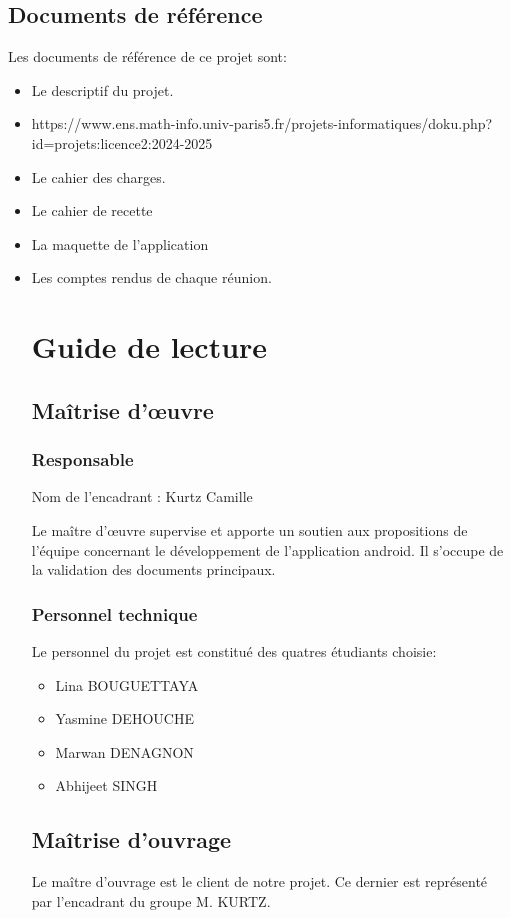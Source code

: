 \documentclass{conception_detaillee}
\begin{document}
\subsection{Documents de référence}
Les documents de référence de ce projet sont: 
\begin{itemize}[label=\textbullet]
\item Le descriptif du projet.
\item https://www.ens.math-info.univ-paris5.fr/projets-informatiques/doku.php?id=projets:licence2:2024-2025
\item Le cahier des charges.
\item Le cahier de recette
\item La maquette de l’application
\item Les comptes rendus de chaque réunion. 

\section{Guide de lecture}

\subsection{Maîtrise d’œuvre}
\subsubsection{Responsable}
Nom de l'encadrant : Kurtz Camille 

Le maître d'œuvre supervise et apporte un soutien aux propositions de l’équipe concernant le développement de l’application android. Il s’occupe de la validation des documents principaux. 
\subsubsection{Personnel technique}
Le personnel du projet est constitué des quatres étudiants choisie: 
\begin{itemize}[label=\textbullet]
\item Lina BOUGUETTAYA 
\item Yasmine DEHOUCHE
\item Marwan DENAGNON 
\item Abhijeet SINGH
\end{itemize}
\subsection{Maîtrise d'ouvrage}
Le maître d’ouvrage est le client de notre projet. Ce dernier est représenté par l’encadrant du groupe M. KURTZ. 

\end{itemize}
\end{document}
